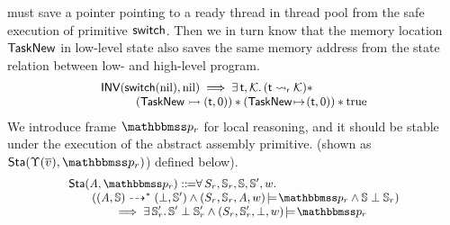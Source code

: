 must save a pointer pointing to a ready thread
in thread pool from the safe execution of primitive $\mathsf{switch}$.
Then we in turn know that the memory location $\mathsf{TaskNew}$
in low-level state also saves the same memory address
from the state relation
between low- and high-level program.
\[
    \small
    \begin{array}{l}
        \textsf{INV}{(\mathsf{switch}(\text{nil}), \text{nil})}
        \implies
        \exists \, \textsf{t}, \mathcal{K}. \,
        ({\textsf{t}} \leadsto_{\textsf{r}} {\mathcal{K}}) * \\
        \qquad\quad
        ({\mathsf{TaskNew}} \rightarrowtail {(\textsf{t}, 0)})
        *
        ({\mathsf{TaskNew}} \!\mapsto\! {(\textsf{t}, 0)})
        * \text{true}
    \end{array}
\]
We introduce frame $\relastP_r$ for local reasoning,
and it should be stable under the execution
of the abstract assembly primitive.
(shown as $\Sta(\hprim(\args{\val}), \relastP_r)$)
defined below).
\[
    \small
    \begin{array}{l}
        \Sta(\primcom, \relastP_r)
        \define
        \forall \, \state_r, \hpstate_r, \hpstate,
        \hpstate', \word. \\
        \qquad
        (\primTransMulti{(\primcom, \hpstate)}{*}{(\primdone, \hpstate')}
        \land \asrtmodel{(\state_r, \hpstate_r, \primcom, \word)}{\relastP_r}
        \land \hpstate\perp\hpstate_r) \\
        \qquad\qquad
        \implies
        \exists\, \hpstate_r'. \,
        \hpstate'\perp\hpstate_r' \land
        \asrtmodel{(\state_r, \hpstate_r', \primdone, \word)}
            {\relastP_r}
    \end{array}
\]

